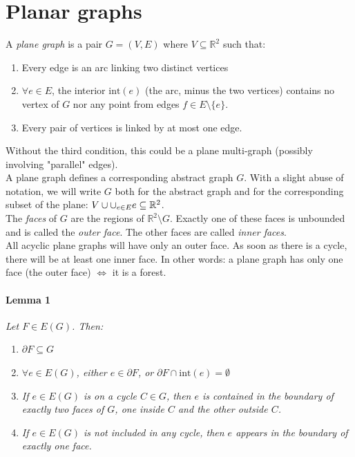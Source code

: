 
\chapter{Planar graphs}
		A \textit{plane graph} is a pair $G = (V,E)$ where $V \subseteq \mathbb{R}^2$ such that:
		\begin{enumerate}
			\item Every edge is an arc linking two distinct vertices
			\item $\forall e \in E$, the interior $\text{int}(e)$ (the arc, minus the two vertices) contains no vertex of $G$ nor any point from edges $f \in E \setminus \{ e \}$.
			\item Every pair of vertices is linked by at most one edge.
		\end{enumerate}
		Without the third condition, this could be a plane multi-graph (possibly involving "parallel" edges).\\
		
		A plane graph defines a corresponding abstract graph $G$. With a slight abuse of notation, we will write $G$ both for the abstract graph and for the corresponding subset of the plane: $V \cup \Large{\cup_{e \in E}} e \subseteq \mathbb{R}^2$.\\
		
		The \textit{faces} of $G$ are the regions of $\mathbb{R}^2 \setminus G$. Exactly one of these faces is unbounded and is called the \textit{outer face}. The other faces are called \textit{inner faces}. \\
		
		All acyclic plane graphs will have only an outer face. As soon as there is a cycle, there will be at least one inner face. In other words: a plane graph has only one face (the outer face) $\iff$ it is a forest. 
		
		\subsubsection{Lemma 1} 
		\textit{Let $F \in E(G)$. Then:}
		\begin{enumerate}
			\item $\partial F \subseteq G$
			\item \textit{$\forall e \in E(G)$, either $e \in \partial F$, or $\partial F \cap \text{int}(e) = \emptyset$}
			\item \textit{If $e \in E(G)$ is on a cycle $C \in G$, then $e$ is contained in the boundary of exactly two faces of $G$, one inside $C$ and the other outside $C$.}
			\item \textit{If $e \in E(G)$ is not included in any cycle, then $e$ appears in the boundary of exactly one face.}
		\end{enumerate}
		
